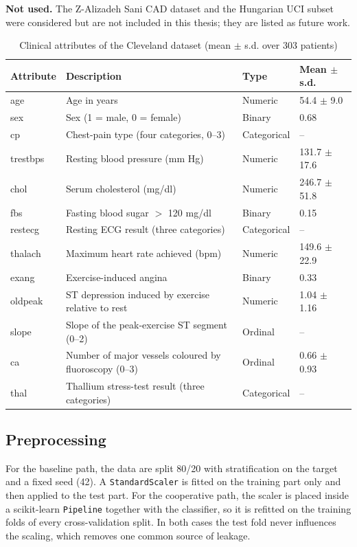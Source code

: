 \documentclass[MTech]{ugthesis}
\begin{document}
\textbf{Not used.} The Z-Alizadeh Sani CAD dataset \citep{alizadehsani2013} and the Hungarian UCI subset were considered but are not included in this thesis; they are listed as future work.

\begin{table}[htpb]
\small
\renewcommand{\arraystretch}{1.25}
\caption{Clinical attributes of the Cleveland dataset (mean $\pm$ s.d. over 303 patients)}
\label{tab:features}
\begin{tabular}{|p{1.7cm}|p{7.2cm}|p{2.2cm}|p{2.3cm}|}
\hline
\textbf{Attribute} & \textbf{Description} & \textbf{Type} & \textbf{Mean $\pm$ s.d.} \\ \hline
age & Age in years & Numeric & 54.4 $\pm$ 9.0 \\ \hline
sex & Sex (1 = male, 0 = female) & Binary & 0.68 \\ \hline
cp & Chest-pain type (four categories, 0--3) & Categorical & -- \\ \hline
trestbps & Resting blood pressure (mm Hg) & Numeric & 131.7 $\pm$ 17.6 \\ \hline
chol & Serum cholesterol (mg/dl) & Numeric & 246.7 $\pm$ 51.8 \\ \hline
fbs & Fasting blood sugar $>$ 120 mg/dl & Binary & 0.15 \\ \hline
restecg & Resting ECG result (three categories) & Categorical & -- \\ \hline
thalach & Maximum heart rate achieved (bpm) & Numeric & 149.6 $\pm$ 22.9 \\ \hline
exang & Exercise-induced angina & Binary & 0.33 \\ \hline
oldpeak & ST depression induced by exercise relative to rest & Numeric & 1.04 $\pm$ 1.16 \\ \hline
slope & Slope of the peak-exercise ST segment (0--2) & Ordinal & -- \\ \hline
ca & Number of major vessels coloured by fluoroscopy (0--3) & Ordinal & 0.66 $\pm$ 0.93 \\ \hline
thal & Thallium stress-test result (three categories) & Categorical & -- \\ \hline
\end{tabular}
\end{table}

\subsection{Preprocessing}
For the baseline path, the data are split 80/20 with stratification on the target and a fixed seed (42). A \texttt{StandardScaler} is fitted on the training part only and then applied to the test part. For the cooperative path, the scaler is placed inside a scikit-learn \texttt{Pipeline} together with the classifier, so it is refitted on the training folds of every cross-validation split. In both cases the test fold never influences the scaling, which removes one common source of leakage.
\end{document}
